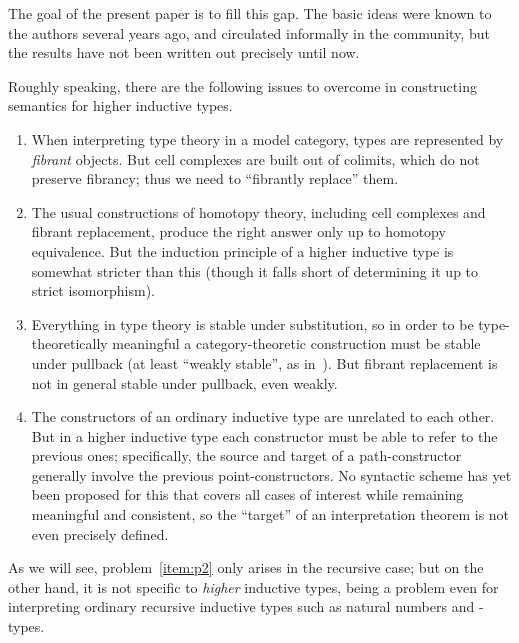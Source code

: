 \documentclass{amsart}
\let\W\iW
\begin{document}
The goal of the present paper is to fill this gap.
The basic ideas were known to the authors several years ago, and circulated informally in the community, but the results have not been written out precisely until now.

Roughly speaking, there are the following issues to overcome in constructing semantics for higher inductive types.
\begin{enumerate}
\item When interpreting type theory in a model category, types are represented by \emph{fibrant} objects.
  But cell complexes are built out of colimits, which do not preserve fibrancy; thus we need to ``fibrantly replace'' them.\label{item:p1}
\item The usual constructions of homotopy theory, including cell complexes and fibrant replacement, produce the right answer only up to homotopy equivalence.
  But the induction principle of a higher inductive type is somewhat stricter than this (though it falls short of determining it up to strict isomorphism).\label{item:p2}
\item Everything in type theory is stable under substitution, so in order to be type-theoretically meaningful a category-theoretic construction must be stable under pullback (at least ``weakly stable'', as in~\cite{lw:localuniv}).
  But fibrant replacement is not in general stable under pullback, even weakly.\label{item:p3}
\item The constructors of an ordinary inductive type are unrelated to each other.
  But in a higher inductive type each constructor must be able to refer to the previous ones; specifically, the source and target of a path-constructor generally involve the previous point-constructors.
  No syntactic scheme has yet been proposed for this that covers all cases of interest while remaining meaningful and consistent, so the ``target'' of an interpretation theorem is not even precisely defined.\label{item:p4}
\end{enumerate}
As we will see, problem~\ref{item:p2} only arises in the recursive case; but on the other hand, it is not specific to \emph{higher} inductive types, being a problem even for interpreting ordinary recursive inductive types such as natural numbers and \W-types.
\end{document}
